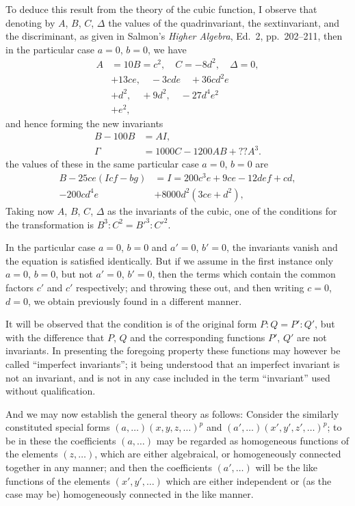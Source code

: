 \documentclass[11pt,a4paper]{article}
\theoremstyle{plain}
\theoremstyle{definition}
\begin{document}
\noindent
To deduce this result from the theory of the cubic function, I observe that
denoting by $A$, $B$, $C$, $\Delta$ the values of the quadrinvariant, the sextinvariant, and the
discriminant, as given in Salmon's \textit{Higher Algebra}, Ed.\ 2, pp.\ 202--211, then in the
particular case $a = 0$, $b = 0$, we have
\begin{align*}
A &= 10 B = c^2, \quad C = -8 d^2, \quad \Delta = 0, \\
&+ 13 ce, \quad -3 cd e \quad + 36 cd^2 e \\
&+ d^2, \quad + 9 d^2, \quad - 27 d^4 e^2 \\
&+ e^2,
\end{align*}
and hence forming the new invariants
\begin{align*}
B - 100 B &= A I, \\
\Gamma &= 1000 C - 1200 A B + ?? A^3.
\end{align*}
the values of these in the same particular case $a = 0$, $b = 0$ are
\begin{align*}
B - 25 ce(I cf - bg) &= I = 200 c^3 e + 9 ce - 12 d ef + cd, \\
- 200 cd^4 e &+ 8000 d^2 (3 ce + d^2),
\end{align*}
Taking now $A$, $B$, $C$, $\Delta$ as the invariants of the cubic, one of the conditions for the
transformation is $B^3 : C^2 = B'^3 : C'^2$.

In the particular case $a = 0$, $b = 0$ and $a' = 0$, $b' = 0$, the invariants vanish and
the equation is satisfied identically.  But if we assume in the first instance only
$a = 0$, $b = 0$, but not $a' = 0$, $b' = 0$, then the terms which contain the common factors $c'$ and $c'$ respectively;
and throwing these out, and then writing $c = 0$, $d = 0$, we obtain
previously found in a different manner.

It will be observed that the condition is of the original form $P : Q = P' : Q'$,
but with the difference that $P$, $Q$ and the corresponding functions $P'$, $Q'$ are not
invariants. In presenting the foregoing property these functions may however be called
``imperfect invariants''; it being understood that an imperfect invariant is not an
invariant, and is not in any case included in the term ``invariant'' used without
qualification.

And we may now establish the general theory as follows: Consider the similarly
constituted special forms $(a, \ldots)(x, y, z, \ldots)^p$ and $(a', \ldots)(x', y', z', \ldots)^p$; to be in these
the coefficients $(a, \ldots)$ may be regarded as homogeneous functions of the elements
$(z, \ldots)$, which are either algebraical, or homogeneously connected together in any
manner; and then the coefficients $(a', \ldots)$ will be the like functions of the elements
$(x', y', \ldots)$ which are either independent or (as the case may be) homogeneously connected
in the like manner.
\end{document}
